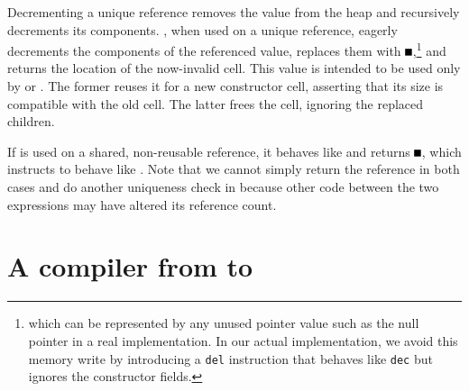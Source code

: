 \documentclass[sigconf]{acmart}
\begin{document}
Decrementing a unique reference removes the value from the heap and recursively
decrements its components.
, when used on a unique reference, eagerly decrements the components
of the referenced value,
replaces them with $\nullptr$,\footnote{which can be represented by
  any unused pointer value such as the null pointer in a real implementation.
  In our actual implementation, we avoid this memory write by introducing a
  \texttt{del} instruction that behaves like \texttt{dec} but ignores the
  constructor fields.}
and returns the location of the now-invalid cell. This value is intended to be
used only by  or . The former reuses it for a new constructor
cell, asserting that its size is compatible with the old cell. The latter frees
the cell, ignoring the replaced children.

If  is used on a shared, non-reusable reference, it behaves like
 and returns $\nullptr$, which instructs  to behave like
. Note that we cannot simply return the reference in both cases and do
another uniqueness check in  because other code between the two
expressions may have altered its reference count.



\section{A compiler from \pureIR{} to \rcIR{}}
\label{sec:compiler}
\end{document}

